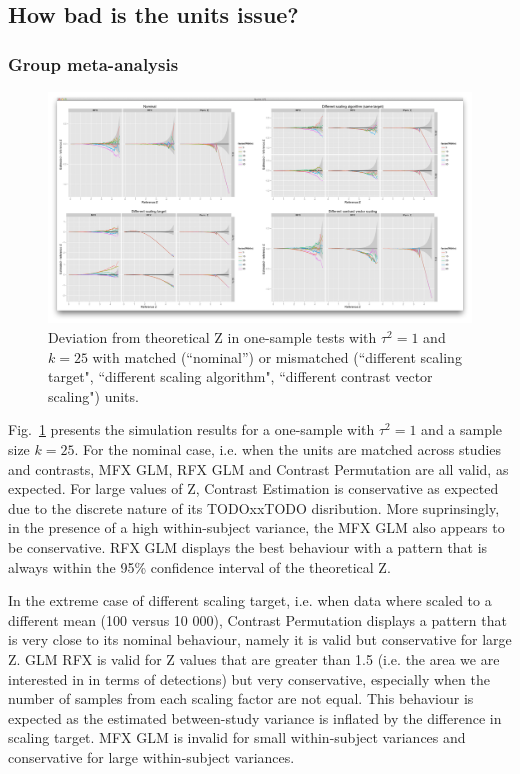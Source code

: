 \documentclass{llncs}
\newcommand{\nStudies}{k}
\newcommand{\varBetween}{\tau^2}
\begin{document}
\subsection{How bad is the units issue?}

\subsubsection{Group meta-analysis}

\begin{figure}[t]
	\centering
	\includegraphics[width=0.99\linewidth]{./figures/test1_k25_btw1.png}
	\caption{Deviation from theoretical Z in one-sample tests with $\varBetween=1$ and $\nStudies = 25$ with matched (``nominal'') or mismatched (``different scaling target", ``different scaling algorithm", ``different contrast vector scaling") units.}
	\label{test1_k25_btw1}
\end{figure}

Fig.~\ref{test1_k25_btw1} presents the simulation results for a one-sample with $\varBetween=1$ and a sample size $\nStudies = 25$. For the nominal case, i.e. when the units are matched across studies and contrasts, MFX GLM, RFX GLM and Contrast Permutation are all valid, as expected. For large values of Z, Contrast Estimation is conservative as expected due to the discrete nature of its TODOxxTODO disribution. More suprinsingly, in the presence of a high within-subject variance, the MFX GLM also appears to be conservative. RFX GLM displays the best behaviour with a pattern that is always within the 95\% confidence interval of the theoretical Z.

In the extreme case of different scaling target, i.e. when data where scaled to a different mean (100 versus 10 000), Contrast Permutation displays a pattern that is very close to its nominal behaviour, namely it is valid but conservative for large Z. GLM RFX is valid for Z values that are greater than 1.5 (i.e. the area we are interested in in terms of detections) but very conservative, especially when the number of samples from each scaling factor are not equal. This behaviour is expected as the estimated between-study variance is inflated by the difference in scaling target. MFX GLM is invalid for small within-subject variances and conservative for large within-subject variances.
\end{document}
